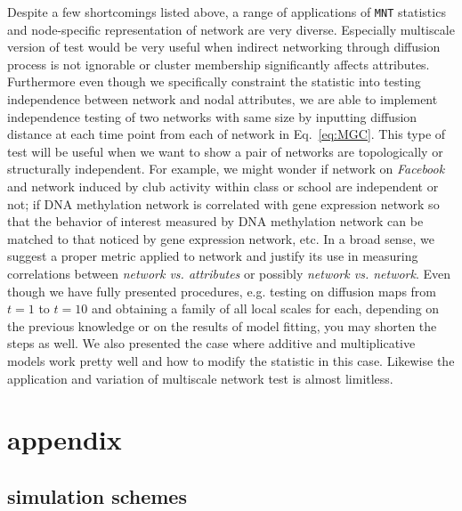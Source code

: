 \documentclass[12pt]{article}
\theoremstyle{definition}
\begin{document}
Despite a few shortcomings listed above, a range of applications of \texttt{MNT} statistics and node-specific representation of network are very diverse. Especially multiscale version of test would be very useful when indirect networking through diffusion process is not ignorable or cluster membership significantly affects attributes. Furthermore even though we specifically constraint the statistic into testing independence between network and nodal attributes, we are able to implement independence testing of two networks with same size by inputting diffusion distance at each time point from each of network in Eq.~\ref{eq:MGC}. This type of test will be useful when we want to show a pair of networks are topologically or structurally independent. For example, we might wonder if network on \textit{Facebook} and network induced by club activity within class or school are independent or not; if DNA methylation network is correlated with gene expression network \citep{bartlett2014dna} so that the behavior of interest measured by DNA methylation network can be matched to that noticed by gene expression network, etc.  In a broad sense, we suggest a proper metric applied to network and justify its use in measuring correlations between \textit{network vs. attributes} or possibly \textit{network vs. network}. Even though we have fully presented procedures, e.g. testing on diffusion maps from $t=1$ to $t=10$  and obtaining a family of all local scales for each, depending on the previous knowledge or on the results of model fitting, you may shorten the steps as well. We also presented the case where additive and multiplicative models work pretty well and how to modify the statistic in this case. Likewise the application and variation of multiscale network test is almost limitless. 


 	
\appendix
\section{appendix}
\label{sec:appendix}

\subsection{simulation schemes}
\end{document}
